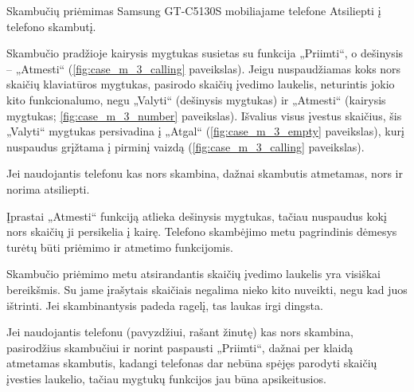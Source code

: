 \begin{xcase}{Skambučių priėmimas Samsung GT-C5130S mobiliajame telefone}
  \xcgoal
  {
    Atsiliepti į telefono skambutį.
  }
  
  \xctools
  {
    Skambučio pradžioje kairysis mygtukas susietas su funkcija „Priimti“, o
    dešinysis – „Atmesti“ (\ref{fig:case_m_3_calling} paveikslas). Jeigu nuspaudžiamas
    koks nors skaičių klaviatūros mygtukas, pasirodo skaičių įvedimo laukelis,
    neturintis jokio kito funkcionalumo, negu „Valyti“ (dešinysis mygtukas) ir
    „Atmesti“ (kairysis mygtukas; \ref{fig:case_m_3_number} paveikslas). Išvalius
    visus įvestus skaičius, šis „Valyti“ mygtukas persivadina į „Atgal“
    (\ref{fig:case_m_3_empty} paveikslas), kurį nuspaudus grįžtama į pirminį vaizdą
    (\ref{fig:case_m_3_calling} paveikslas).

    {
    }
  }
  
  \xcresult
  {
    Jei naudojantis telefonu kas nors skambina, dažnai skambutis atmetamas,
    nors ir norima atsiliepti.
  }
  
  \xcprinciples
  {
    {
      Įprastai „Atmesti“ funkciją atlieka dešinysis mygtukas, tačiau
      nuspaudus kokį nors skaičių ji persikelia į kairę. Telefono
      skambėjimo metu pagrindinis dėmesys turėtų būti priėmimo ir atmetimo
      funkcijomis.
    }
  }
  
  \xcthoughts
  {
    Skambučio priėmimo metu atsirandantis skaičių įvedimo laukelis yra
    visiškai bereikšmis. Su jame įrašytais skaičiais negalima nieko kito
    nuveikti, negu kad juos ištrinti. Jei skambinantysis padeda ragelį,
    tas laukas irgi dingsta.

    Jei naudojantis telefonu (pavyzdžiui, rašant žinutę) kas nors skambina,
    pasirodžius skambučiui ir norint paspausti „Priimti“, dažnai per klaidą
    atmetamas skambutis, kadangi telefonas dar nebūna spėjęs parodyti
    skaičių įvesties laukelio, tačiau mygtukų funkcijos jau būna
    apsikeitusios.
  }
\end{xcase}
